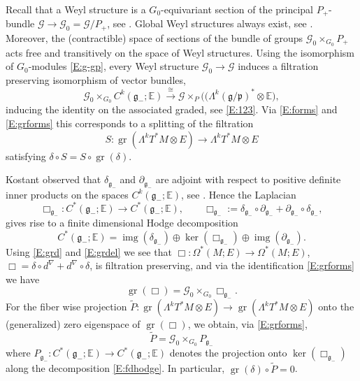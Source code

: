\documentclass[reqno,12pt]{amsart}
\DeclareMathOperator{\img}{img}
\DeclareMathOperator{\gr}{gr}
\newcommand\goe{\mathfrak g}
\newcommand\poe{\mathfrak p}
\theoremstyle{plain}
\theoremstyle{definition}
\begin{document}
Recall that a Weyl structure is a $G_0$-equivariant section of the principal $P_+$-bundle $\mathcal G\to\mathcal G_0=\mathcal G/P_+$, see \cite[Definition~5.1.1]{CS09}.
Global Weyl structures always exist, see \cite[Proposition~5.1.1]{CS09}. Moreover, the (contractible) space of sections of the bundle of groups $\mathcal G_0\times_{G_0}P_+$
acts free and transitively on the space of Weyl structures.
Using the isomorphism of $G_0$-modules \eqref{E:g-gp}, every Weyl structure $\mathcal G_0\to\mathcal G$ induces a filtration preserving isomorphism of vector bundles,
\begin{equation*}\label{E:sigma}
\mathcal G_0\times_{G_0}C^k(\goe_-;\mathbb E)\xrightarrow\cong\mathcal G\times_P\bigl((\Lambda^k(\goe/\poe)^*\otimes\mathbb E\bigr),
\end{equation*}
inducing the identity on the associated graded, see \eqref{E:123}.
Via \eqref{E:forms} and \eqref{E:grforms} this corresponds to a splitting of the filtration
$$
S\colon\gr(\Lambda^kT^*M\otimes E)\to\Lambda^kT^*M\otimes E
$$
satisfying $\delta\circ S=S\circ\gr(\delta)$.


Kostant \cite{K61} observed that $\delta_{\goe_-}$ and $\partial_{\goe_-}$ are adjoint with respect to positive definite inner products on the spaces $C^k(\goe_-;\mathbb E)$, see \cite[Proposition~3.1.1]{CS09}.
Hence the Laplacian
$$
\Box_{\goe_-}\colon C^*(\goe_-;\mathbb E)\to C^*(\goe_-;\mathbb E),\qquad
\Box_{\goe_-}:=\delta_{\goe_-}\circ\partial_{\goe_-}+\partial_{\goe_-}\circ\delta_{\goe_-},
$$
gives rise to a finite dimensional Hodge decomposition
\begin{equation}\label{E:fdhodge}
C^*(\goe_-;\mathbb E)=\img(\delta_{\goe_-})\oplus\ker(\Box_{\goe_-})\oplus\img(\partial_{\goe_-}).
\end{equation}
Using \eqref{E:grd} and \eqref{E:grdel} we see that $\Box\colon\Omega^*(M;E)\to\Omega^*(M;E)$, $\Box=\delta\circ d^\nabla+d^\nabla\circ\delta$, is filtration preserving, and via the identification \eqref{E:grforms} we have
\begin{equation}\label{E:grBox}
\gr(\Box)=\mathcal G_0\times_{G_0}\Box_{\goe_-}.
\end{equation}
For the fiber wise projection $\tilde P\colon\gr(\Lambda^kT^*M\otimes E)\to\gr(\Lambda^kT^*M\otimes E)$ onto the (generalized) zero eigenspace of $\gr(\Box)$, we obtain, via \eqref{E:grforms},
$$
\tilde P=\mathcal G_0\times_{G_0}P_{\goe_-}
$$
where $P_{\goe_-}\colon C^*(\goe_-;\mathbb E)\to C^*(\goe_-;\mathbb E)$ denotes the projection onto $\ker(\Box_{\goe_-})$ along the decomposition \eqref{E:fdhodge}.
In particular, $\gr(\delta)\circ\tilde P=0$.
\end{document}
